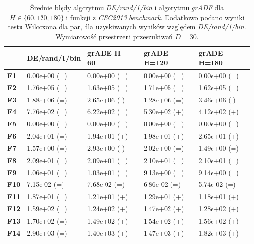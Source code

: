 \documentclass[12pt,a4paper]{report}
\begin{document}
{{{{{{{\begin{table}[h]
\centering
\caption{Średnie błędy algorytmu \emph{DE/rand/1/bin} i algorytmu \emph{grADE} dla $H \in \{60, 120, 180\}$ i funkcji z \emph{CEC2013 benchmark}. Dodatkowo podano wyniki testu Wilcoxona dla par, dla uzyskiwanych wyników względem \emph{DE/rand/1/bin}. Wymiarowość przestrzeni przeszukiwań $D = 30$.}
\label{Anal11}
\begin{tabular}{|l|l|l|l|l|}
\hline
          & {\bf DE/rand/1/bin} & {\bf grADE H = 60} & {\bf grADE H=120} & {\bf grADE H=180} \\ \hline
{\bf F1}  & 0.00e+00 (=)        & 0.00e+00 (=)       & 0.00e+00 (=)      & 0.00e+00 (=)      \\ \hline
{\bf F2}  & 1.76e+05 (=)        & 1.63e+05 (=)       & 1.71e+05 (=)      & 1.62e+05 (=)      \\ \hline
{\bf F3}  & 1.88e+06 (=)        & 2.65e+06 (-)       & 1.28e+06 (=)      & 3.46e+06 (-)      \\ \hline
{\bf F4}  & 7.76e+02 (=)        & 6.22e+02 (=)       & 5.30e+02 (+)      & 4.12e+02 (+)      \\ \hline
{\bf F5}  & 0.00e+00 (=)        & 0.00e+00 (=)       & 0.00e+00 (=)      & 0.00e+00 (=)      \\ \hline
{\bf F6}  & 2.04e+01 (=)        & 1.94e+01 (+)       & 1.98e+01 (+)      & 2.65e+01 (+)      \\ \hline
{\bf F7}  & 1.57e+00 (=)        & 2.93e+00 (-)       & 2.02e+00 (=)      & 1.49e+00 (=)      \\ \hline
{\bf F8}  & 2.09e+01 (=)        & 2.09e+01 (=)       & 2.10e+01 (=)      & 2.10e+01 (=)      \\ \hline
{\bf F9}  & 1.06e+01 (=)        & 1.03e+01 (=)       & 9.13e+00 (=)      & 9.14e+00 (=)      \\ \hline
{\bf F10} & 7.15e-02 (=)        & 7.68e-02 (=)       & 6.86e-02 (=)      & 5.74e-02 (=)      \\ \hline
{\bf F11} & 1.87e+01 (=)        & 1.21e+01 (+)       & 1.29e+01 (+)      & 1.18e+01 (+)      \\ \hline
{\bf F12} & 1.59e+02 (=)        & 1.24e+02 (+)       & 1.47e+02 (+)      & 1.28e+02 (+)      \\ \hline
{\bf F13} & 1.70e+02 (=)        & 1.49e+02 (+)       & 1.54e+02 (+)      & 1.56e+02 (+)      \\ \hline
{\bf F14} & 2.90e+03 (=)        & 1.40e+03 (+)       & 1.47e+03 (+)      & 1.82e+03 (+)      \\ \hline

\end{tabular}
\end{table}}}}}}}}
\end{document}
